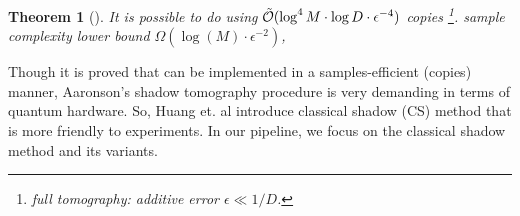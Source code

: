 \documentclass[
aps,
pra,
twocolumn,
floatfix,
]{revtex4-2}
\theoremstyle{plain}
\newtheorem{theorem}{Theorem}
\theoremstyle{definition}
\newtheorem{remark}{Remark}
\begin{document}
\begin{theorem}[\cite{aaronsonShadowTomographyQuantum2018}]\label{thm:shadow_tomography}
	It is possible to do  using $\tilde{\mathcal{O}}(\log^4 M\cdot \log D\cdot\epsilon^{-4})$ copies
	\footnote{full tomography: additive error $\epsilon\ll 1/D$.}.
	sample complexity lower bound $\Omega(\log (M) \cdot \epsilon^{-2})$, 
\end{theorem}
Though it is proved that  can be implemented in a samples-efficient (copies) manner,
Aaronson's shadow tomography procedure is very demanding in terms of quantum hardware.
So, Huang et. al \cite{huangPredictingManyProperties2020} introduce classical shadow (CS) method that is more friendly to experiments.
In our pipeline, we focus on the classical shadow method and its variants.
\end{document}
